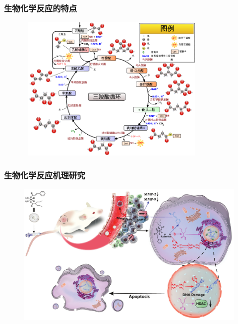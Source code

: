 \frame
{
	\frametitle{生物化学反应的特点}
\begin{figure}[h!]
\centering
\vspace{-10.5pt}
\includegraphics[height=2.80in,width=3.70in,viewport=0 0 750 600,clip]{Figures/Citric_acid_cycle_with_aconitate_Chinese.png}
\label{Bio-Chem}
\end{figure}
}

\frame
{
	\frametitle{生物化学反应机理研究}
\begin{figure}[h!]
\centering
\vspace{-8.5pt}
\includegraphics[height=0.67\textwidth,width=1.0\textwidth,viewport=0 0 1380 900,clip]{Figures/anti-tumour_mechanism-of the-Cin-Pt(IV)-Val-complex.png}
\label{mechanism}
\end{figure}
}

